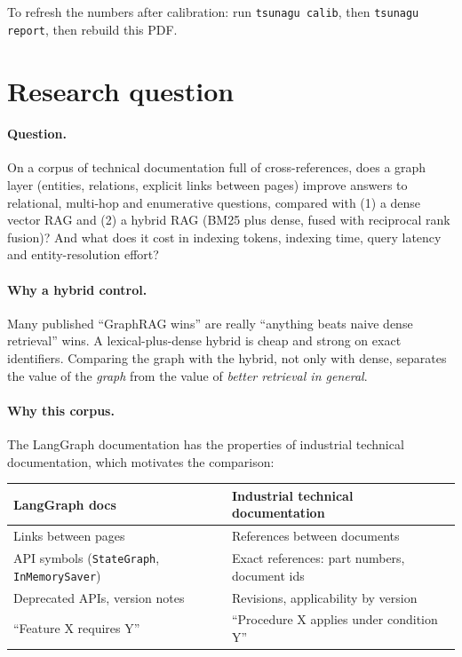 \documentclass[11pt,a4paper]{article}
\newcommand{\code}[1]{\texttt{#1}}
\begin{document}
To refresh the numbers after calibration: run \code{tsunagu calib}, then \code{tsunagu report},
then rebuild this PDF.

\section{Research question}

\paragraph{Question.} On a corpus of technical documentation full of cross-references, does a
graph layer (entities, relations, explicit links between pages) improve answers to relational,
multi-hop and enumerative questions, compared with (1) a dense vector RAG and (2) a hybrid RAG
(BM25 plus dense, fused with reciprocal rank fusion)? And what does it cost in indexing tokens,
indexing time, query latency and entity-resolution effort?

\paragraph{Why a hybrid control.} Many published ``GraphRAG wins'' are really ``anything beats
naive dense retrieval'' wins. A lexical-plus-dense hybrid is cheap and strong on exact
identifiers. Comparing the graph with the hybrid, not only with dense, separates the value of
the \emph{graph} from the value of \emph{better retrieval in general}.

\paragraph{Why this corpus.} The LangGraph documentation has the properties of industrial
technical documentation, which motivates the comparison:

\begin{center}
\begin{tabular}{ll}
\toprule
LangGraph docs & Industrial technical documentation \\
\midrule
Links between pages & References between documents \\
API symbols (\code{StateGraph}, \code{InMemorySaver}) & Exact references: part numbers, document ids \\
Deprecated APIs, version notes & Revisions, applicability by version \\
``Feature X requires Y'' & ``Procedure X applies under condition Y'' \\
\bottomrule
\end{tabular}
\end{center}
\end{document}
